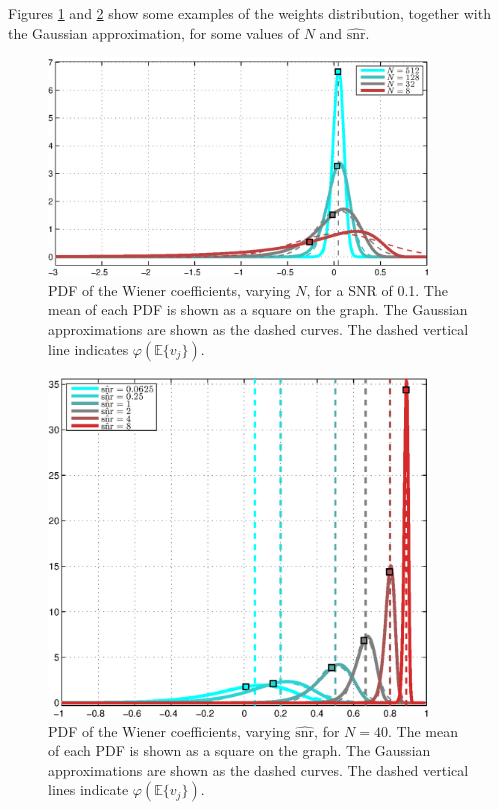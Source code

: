 \documentclass[a4paper,10pt]{article}
\begin{document}
Figures \ref{fig:wiener_pdf_N} and \ref{fig:wiener_pdf_snr} show some examples of 
the weights distribution, together with the Gaussian approximation, for some values of
$N$ and $\hat{\text{snr}}$.

\begin{figure}[htpb!]
	\centering
	\includegraphics[width=0.9\textwidth]{weight_pdf}
	\caption{PDF of the Wiener coefficients, varying $N$, for a SNR of 0.1. The mean of each PDF
	is shown as a square on the graph. The Gaussian approximations are shown as
	the dashed curves. The dashed vertical line indicates $\varphi(\mathbb E\{v_j\})$.}
	\label{fig:wiener_pdf_N}
\end{figure}

\begin{figure}[htpb!]
	\centering
	\includegraphics[width=0.9\textwidth]{weight_pdf-snr}
	\caption{PDF of the Wiener coefficients, varying $\hat{\text{snr}}$, for $N = 40$. The mean of each PDF
	is shown as a square on the graph. The Gaussian approximations are shown as
	the dashed curves. The dashed vertical lines indicate $\varphi(\mathbb E\{v_j\})$.}
	\label{fig:wiener_pdf_snr}
\end{figure}
\end{document}
